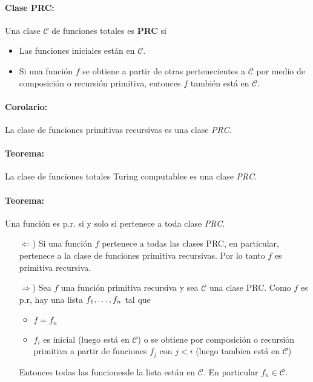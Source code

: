	\paragraph{Clase PRC:}	Una clase $\mathcal{C}$ de funciones totales es \textbf{PRC} si
	\begin{itemize}
		\item Las funciones iniciales están en $\mathcal{C}$.
		\item Si una función $f$ se obtiene a partir de otras pertenecientes a $\mathcal{C}$ por medio de composición o recursión primitiva, entonces $f$ también está en $\mathcal{C}$.
	\end{itemize}

	\paragraph{Corolario:} La clase de funciones primitivas recursivas es una clase \textit{PRC}.
	\paragraph{Teorema:} La clase de funciones totales Turing computables es una clase \textit{PRC}.
		
	\paragraph{Teorema:} Una función es p.r. si y solo si pertenece a toda clase \textit{PRC}.
	
	\begin{demo}
		\begin{itemize}
			\item[$\Leftarrow$)] Si una función $f$ pertenece a todas las clases PRC, en particular, pertenece a la clase de funciones primitiva recursivas. Por lo tanto $f$ es primitiva recursiva.
			\item[$\Rightarrow$)] Sea $f$ una función primitiva recursiva y sea $\mathcal{C}$ una clase PRC. Como $f$ es p.r, hay una lista $f_1,\dots, f_{n}$
			tal que
			\begin{itemize}
				\item $f = f_n$
				\item $f_i$ es inicial (luego está en $\mathcal{C}$) o se obtiene por composición o recursión primitiva a partir de funciones $f_j$ con $j < i$ (luego tambien está en $\mathcal{C}$)
			\end{itemize}
			Entonces todas las funcionesde la lista están en $\mathcal{C}$. En particular $f_n\in\mathcal{C}$.
		\end{itemize}
	\end{demo}
	
